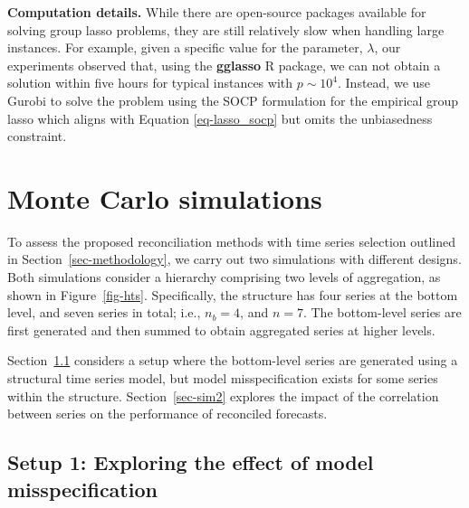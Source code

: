 \documentclass[
  11pt]{article}
\theoremstyle{plain}
\theoremstyle{remark}
\begin{document}
\textbf{Computation details.} While there are open-source packages
available for solving group lasso problems, they are still relatively
slow when handling large instances. For example, given a specific value
for the parameter, \(\lambda\), our experiments observed that, using the
\textbf{gglasso} R package, we can not obtain a solution within five
hours for typical instances with \(p \sim 10^4\). Instead, we use Gurobi
to solve the problem using the SOCP formulation for the empirical group
lasso which aligns with Equation \eqref{eq-lasso_socp} but omits the
unbiasedness constraint.

\section{Monte Carlo simulations}\label{sec-simulations}

To assess the proposed reconciliation methods with time series selection
outlined in Section~\ref{sec-methodology}, we carry out two simulations
with different designs. Both simulations consider a hierarchy comprising
two levels of aggregation, as shown in Figure~\ref{fig-hts}.
Specifically, the structure has four series at the bottom level, and
seven series in total; i.e., \(n_b = 4\), and \(n = 7\). The
bottom-level series are first generated and then summed to obtain
aggregated series at higher levels.

Section~\ref{sec-sim1} considers a setup where the bottom-level series
are generated using a structural time series model, but model
misspecification exists for some series within the structure.
Section~\ref{sec-sim2} explores the impact of the correlation between
series on the performance of reconciled forecasts.

\subsection{Setup 1: Exploring the effect of model
misspecification}\label{sec-sim1}
\end{document}
